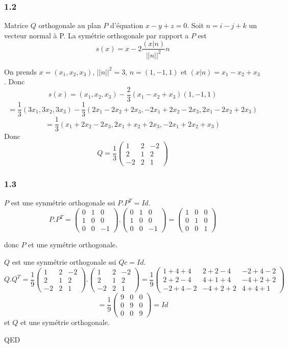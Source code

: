 \documentclass[]{book}
\theoremstyle{definition}
\begin{document}
\subsubsection*{1.2}
Matrice $Q$ orthogonale au plan $P$ d'\'equation $x-y+z=0$.
Soit $n = i-j+k$ un vecteur normal \`a P. La sym\'etrie orthogonale par rapport a $P$ est 
$$s(x) = x -2 \frac{(x|n)}{||n||^2}n$$

On prends $x=(x_1, x_2, x_3)$,  $||n||^2 = 3$, $n=(1,-1,1)$ et $(x|n) = x_1-x_2+x_3$. Donc
$$s(x) = (x_1, x_2, x_3) - \frac{2}{3}(x_1-x_2+x_3)(1,-1,1) $$
$$ = \frac{1}{3}(3x_1, 3x_2, 3x_3) - \frac{1}{3} (2x_1-2x_2+2x_3, -2x_1+2x_2-2x_3, 2x_1-2x_2+2x_3)$$
$$ = \frac{1}{3}(x_1+2x_2-2x_3, 2x_1+x_2+2x_3, -2x_1+2x_2+x_3)$$
Donc
$$ Q = \frac{1}{3}\begin{pmatrix} 1 & 2 & -2 \\ 2 & 1 & 2 \\ -2 & 2 & 1 \end{pmatrix} $$


\subsubsection*{1.3}
$P$ est une synm\'etrie orthogonale ssi $P.P^T = Id$.
$$
P.P^T = \begin{pmatrix} 0 & 1 & 0 \\ 1 & 0 & 0 \\ 0 & 0 & -1 \end{pmatrix}.\begin{pmatrix} 0 & 1 & 0 \\ 1 & 0 & 0 \\ 0 & 0 & -1 \end{pmatrix} = \begin{pmatrix} 1 & 0 & 0 \\ 0 & 1 & 0 \\ 0 & 0 & 1 \end{pmatrix}
$$

donc
$P$ et une sym\'etrie orthogonale.


$Q$ est une synm\'etrie orthogonale ssi $Qc = Id$.
$$Q.Q^T = \frac{1}{9}\begin{pmatrix} 1 & 2 & -2 \\ 2 & 1 & 2 \\ -2 & 2 & 1 \end{pmatrix}.\begin{pmatrix} 1 & 2 & -2 \\ 2 & 1 & 2 \\ -2 & 2 & 1 \end{pmatrix} = \frac{1}{9}\begin{pmatrix} 1+4+4 & 2+2-4 & -2+4-2 \\ 2+2-4 & 4+1+4 & -4+2+2 \\ -2+4-2 & -4+2+2 & 4+4+1 \end{pmatrix} $$
$$= \frac{1}{9}\begin{pmatrix} 9 & 0 & 0 \\ 0 & 9 & 0 \\ 0 & 0 & 9 \end{pmatrix} = Id$$
et 
$Q$ et une sym\'etrie orthogonale.

QED
\end{document}
